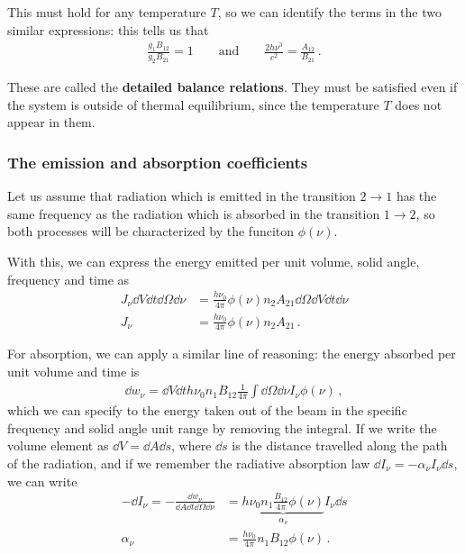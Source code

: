 \documentclass[main.tex]{subfiles}
\begin{document}
This must hold for any temperature \(T\), so we can identify the terms in the two similar expressions: this tells us that 
%
\begin{align}
\frac{g_1 B_{12} }{g_2 B_{21} } = 1 
\qquad \text{and} \qquad
\frac{2 h \nu^3}{c^2} = \frac{A_{12} }{B_{21} }
\,.
\end{align}

These are called the \textbf{detailed balance relations}. They must be satisfied even if the system is outside of thermal equilibrium, since the temperature \(T\) does not appear in them. 


\subsubsection{The emission and absorption coefficients}

Let us assume that radiation which is emitted in the transition \(2 \to 1\) has the same frequency as the radiation which is absorbed in the transition \(1 \to 2\), so both processes will be characterized by the funciton \(\phi (\nu )\). 

With this, we can express the energy emitted per unit volume, solid angle, frequency and time as 
%
\begin{align}
J_\nu \dd{V} \dd{t} \dd{\Omega } \dd{\nu } &= \frac{h \nu_0}{4 \pi } \phi (\nu ) n_2 A_{21} \dd{\Omega } \dd{V} \dd{t} \dd{\nu }  \\ 
J_\nu &= \frac{h \nu_0}{4 \pi } \phi (\nu ) n_2 A_{21}  
\,.
\end{align}

For absorption, we can apply a similar line of reasoning: 
the energy absorbed per unit volume and time is 
%
\begin{align}
\dd{w}_\nu = 
\dd{V} \dd{t} h \nu_0 n_1 B_{12} \frac{1}{4 \pi } \int \dd{\Omega } \dd{\nu } I_\nu \phi (\nu )
\,,
\end{align}
%
which we can specify to the energy taken out of the beam in the specific frequency and solid angle unit range by removing the integral. 
If we write the volume element as \(\dd{V} = \dd{A} \dd{s}\), where \(\dd{s}\) is the distance travelled along the path of the radiation, and if we remember the radiative absorption law \(\dd{I_\nu } = - \alpha _\nu I_\nu \dd{s}\), we can write 
%
\begin{align}
- \dd{I_\nu } = -\frac{ \dd{w}_\nu }{ \dd{A} \dd{t} \dd{\Omega } \dd{\nu }}
&= \underbrace{h \nu_0 n_1 \frac{B_{12}}{4 \pi } \phi(\nu )}_{\alpha _\nu } I_\nu  \dd{s} \\ 
\alpha_\nu &= \frac{h \nu_0  }{4 \pi } n_1 B_{12} \phi (\nu )
\,.
\end{align}
\end{document}
